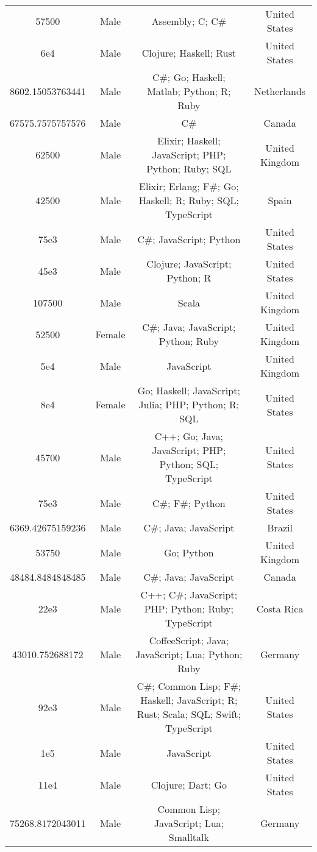 \begin{center}
\begin{tabular}{ |c|c|c|c| }
57500  &  Male  &  Assembly; C; C\#  &  United States  \\ 
6e4  &  Male  &  Clojure; Haskell; Rust  &  United States  \\ 
8602.15053763441  &  Male  &  C\#; Go; Haskell; Matlab; Python; R; Ruby  &  Netherlands  \\ 
67575.7575757576  &  Male  &  C\#  &  Canada  \\ 
62500  &  Male  &  Elixir; Haskell; JavaScript; PHP; Python; Ruby; SQL  &  United Kingdom  \\ 
42500  &  Male  &  Elixir; Erlang; F\#; Go; Haskell; R; Ruby; SQL; TypeScript  &  Spain  \\ 
75e3  &  Male  &  C\#; JavaScript; Python  &  United States  \\ 
45e3  &  Male  &  Clojure; JavaScript; Python; R  &  United States  \\ 
107500  &  Male  &  Scala  &  United Kingdom  \\ 
52500  &  Female  &  C\#; Java; JavaScript; Python; Ruby  &  United Kingdom  \\ 
5e4  &  Male  &  JavaScript  &  United Kingdom  \\ 
8e4  &  Female  &  Go; Haskell; JavaScript; Julia; PHP; Python; R; SQL  &  United States  \\ 
45700  &  Male  &  C++; Go; Java; JavaScript; PHP; Python; SQL; TypeScript  &  United States  \\ 
75e3  &  Male  &  C\#; F\#; Python  &  United States  \\ 
6369.42675159236  &  Male  &  C\#; Java; JavaScript  &  Brazil  \\ 
53750  &  Male  &  Go; Python  &  United Kingdom  \\ 
48484.8484848485  &  Male  &  C\#; Java; JavaScript  &  Canada  \\ 
22e3  &  Male  &  C++; C\#; JavaScript; PHP; Python; Ruby; TypeScript  &  Costa Rica  \\ 
43010.752688172  &  Male  &  CoffeeScript; Java; JavaScript; Lua; Python; Ruby  &  Germany  \\ 
92e3  &  Male  &  C\#; Common Lisp; F\#; Haskell; JavaScript; R; Rust; Scala; SQL; Swift; TypeScript  &  United States  \\ 
1e5  &  Male  &  JavaScript  &  United States  \\ 
11e4  &  Male  &  Clojure; Dart; Go  &  United States  \\ 
75268.8172043011  &  Male  &  Common Lisp; JavaScript; Lua; Smalltalk  &  Germany  \\ 

\end{tabular}
\end{center}
